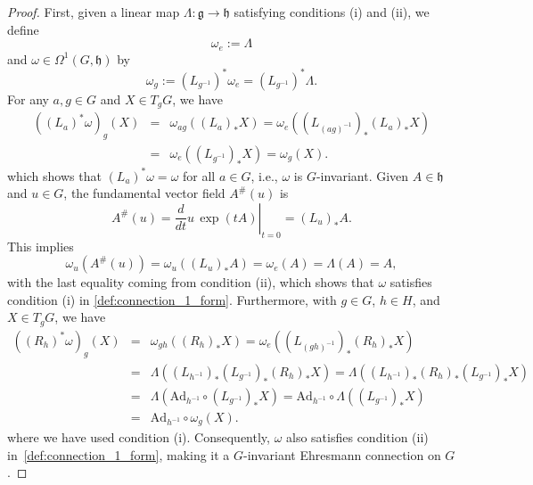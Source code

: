 \documentclass[12pt,a4paper]{article}
\numberwithin{equation}{section}
\theoremstyle{plain}
\theoremstyle{definition}
\theoremstyle{remark}
\begin{document}
\begin{proof}
    First, given a linear map $\Lambda:\mathfrak{g}\to\mathfrak{h}$ satisfying conditions (i) and (ii), we define
    \begin{equation}
        \omega_e:=\Lambda    
    \end{equation}
    and $ \omega\in\Omega^1(G,\mathfrak{h})$ by
    \begin{equation}
        \omega_g:=\left(L_{g^{-1}}\right)^* \omega_e = \left(L_{g^{-1}}\right)^*\Lambda.
    \end{equation}
    For any $a,g\in G$ and $X\in T_gG$, we have
    \begin{eqnarray*}
        \left((L_a)^*\omega\right)_g(X) &=& \omega_{ag}\left((L_a)_*X\right) = \omega_{e}\left(\left(L_{(ag)^{-1}}\right)_*(L_a)_*X\right)\\
        &=& \omega_{e}\left(\left(L_{g^{-1}}\right)_*X\right) = \omega_g(X).
    \end{eqnarray*}
    which shows that $(L_a)^*\omega=\omega$ for all $a\in G$, i.e., $\omega$ is $G$-invariant. Given $A\in\mathfrak{h}$ and $u\in G$, the fundamental vector field $A^\#(u)$ is 
    \begin{equation}
        A^\#(u)=\left.\frac{d}{dt}u\,\exp(tA)\right|_{t=0}=(L_u)_*A.
    \end{equation}
    This implies
    \begin{equation}
        \omega_u(A^\#(u))=\omega_u((L_u)_*A)=\omega_e(A)=\Lambda(A)=A,
    \end{equation}
    with the last equality coming from condition (ii), which shows that $\omega$ satisfies condition (i) in \cref{def:connection_1_form}. Furthermore, with $g\in G$, $h\in H$, and $X\in T_gG$, we have
    \begin{eqnarray*}
        \left(\left(R_h\right)^*\omega\right)_g(X) &=& \omega_{gh}\left((R_h)_*X\right) = \omega_e\left(\left(L_{(gh)^{-1}}\right)_*(R_h)_*X\right)\\
        &=& \Lambda(\left(L_{h^{-1}}\right)_*\left(L_{g^{-1}}\right)_*(R_h)_*X) = \Lambda(\left(L_{h^{-1}}\right)_*(R_h)_*\left(L_{g^{-1}}\right)_*X)\\
        &=& \Lambda(\mathrm{Ad}_{h^{-1}}\circ\left(L_{g^{-1}}\right)_*X) = \mathrm{Ad}_{h^{-1}}\circ\Lambda(\left(L_{g^{-1}}\right)_*X)\\
        &=& \mathrm{Ad}_{h^{-1}}\circ\omega_g(X).
    \end{eqnarray*}
    where we have used condition (i). Consequently, $\omega$ also satisfies condition (ii) in~\cref{def:connection_1_form}, making it a $G$-invariant Ehresmann connection on $G$.
    

\end{proof}
\end{document}
